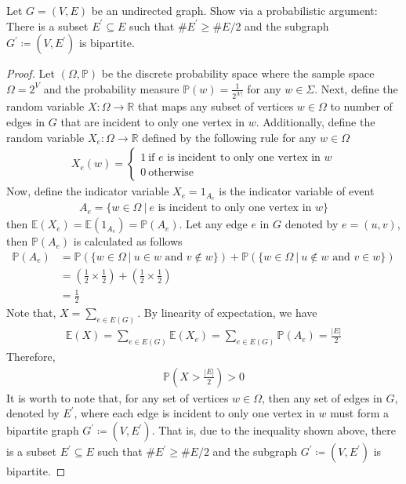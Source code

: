 \begin{problem}
  Let $G=(V,E)$ be an undirected graph. Show via a probabilistic argument: There is a subset $E^{'} \subseteq E$ such that $\# E^{'} \geq \#E/2$ and the subgraph $G^{'} \coloneqq (V,E^{'})$ is bipartite.
\end{problem}
\begin{proof}
  Let $(\Omega, \mathbb{P})$ be the discrete probability space where the sample space $\Omega=2^{V}$ and the probability measure $\mathbb{P}(w) = \frac{1}{2^{|V|}}$ for any $w \in \Sigma$. Next, define the random variable $X: \Omega \to \mathbb{R}$ that maps any subset of vertices $w \in \Omega$ to number of edges in $G$ that are incident to only one vertex in $w$. Additionally, define the random variable $X_{e}: \Omega \to \mathbb{R}$ defined by the following rule for any $w \in \Omega$
  \begin{align*}
    X_{e}(w) = 
    \begin{cases}
      1 \ \text{if $e$ is incident to only one vertex in $w$} \\
      0 \ \text{otherwise}
    \end{cases}
  \end{align*}
  Now, define the indicator variable $X_{e} = 1_{A_{e}}$ is the indicator variable of event
  \begin{align*}
    A_{e} = \{w \in \Omega \ | \ \text{$e$ is incident to only one vertex in $w$}\}   
  \end{align*}
  then $\mathbb{E}(X_{e}) = \mathbb{E}(1_{A_{e}}) = \mathbb{P}(A_{e})$. Let any edge $e$ in $G$ denoted by $e=(u,v)$, then $\mathbb{P}(A_{e})$ is calculated as follows
  \begin{align*}
    \mathbb{P}(A_{e}) &= \mathbb{P}(\{w \in \Omega \ | \ u \in w \text{ and } v \notin w\})  + \mathbb{P}(\{w \in \Omega \ | \ u \notin w \text{ and } v \in w\}) \\
                      &= \left( \frac{1}{2} \times \frac{1}{2} \right) + \left( \frac{1}{2} \times \frac{1}{2} \right) \\
                      &= \frac{1}{2}  
  \end{align*}
  Note that, $X = \sum_{e \in E(G)}$. By linearity of expectation, we have
  \begin{align*}
    \mathbb{E}(X) = \sum_{e \in E(G)} \mathbb{E}(X_{e}) = \sum_{e \in E(G)} \mathbb{P}(A_{e}) = \frac{|E|}{2}
  \end{align*}
  Therefore,
  \begin{align*}
    \mathbb{P}(X > \frac{|E|}{2}) > 0
  \end{align*}
  It is worth to note that, for any set of vertices $w \in \Omega$, then any set of edges in $G$, denoted by $E^{'}$, where each edge is incident to only one vertex in $w$ must form a bipartite graph $G^{'} \coloneqq (V,E^{'})$. That is, due to the inequality shown above, there is a subset $E^{'} \subseteq E$ such that $\#E^{'} \geq \#E/2$ and the subgraph $G^{'} \coloneqq (V,E^{'})$ is bipartite.
\end{proof}

